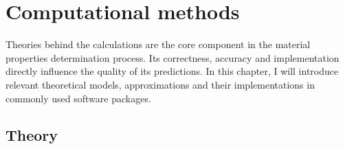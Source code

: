 
\chapter{Computational methods \label{chap:2}}
%
\ifpdf
    \graphicspath{{Chapter2/Figs/Raster/}{Chapter2/Figs/PDF/}{Chapter2/Figs/}{Chapter2/Figs/Vector/}}
\else
    \graphicspath{{Chapter2/Figs/Vector/}{Chapter2/Figs/}}
\fi
%
Theories behind the calculations are the core component in the material properties determination process. Its correctness, accuracy and implementation directly influence the quality of its predictions. In this chapter, I will introduce relevant theoretical models, approximations and their implementations in commonly used software packages.
%
\section{Theory}
